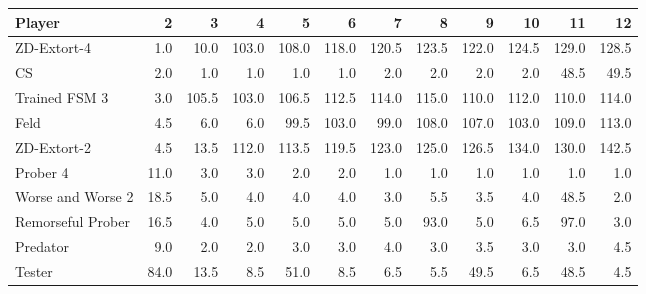 \begin{tabular}{lrrrrrrrrrrr}
\toprule
            Player &     2 &      3 &      4 &      5 &      6 &      7 &      8 &      9 &     10 &     11 &     12 \\
\midrule
       ZD-Extort-4 &   1.0 &   10.0 &  103.0 &  108.0 &  118.0 &  120.5 &  123.5 &  122.0 &  124.5 &  129.0 &  128.5 \\
                CS &   2.0 &    1.0 &    1.0 &    1.0 &    1.0 &    2.0 &    2.0 &    2.0 &    2.0 &   48.5 &   49.5 \\
     Trained FSM 3 &   3.0 &  105.5 &  103.0 &  106.5 &  112.5 &  114.0 &  115.0 &  110.0 &  112.0 &  110.0 &  114.0 \\
              Feld &   4.5 &    6.0 &    6.0 &   99.5 &  103.0 &   99.0 &  108.0 &  107.0 &  103.0 &  109.0 &  113.0 \\
       ZD-Extort-2 &   4.5 &   13.5 &  112.0 &  113.5 &  119.5 &  123.0 &  125.0 &  126.5 &  134.0 &  130.0 &  142.5 \\
          Prober 4 &  11.0 &    3.0 &    3.0 &    2.0 &    2.0 &    1.0 &    1.0 &    1.0 &    1.0 &    1.0 &    1.0 \\
 Worse and Worse 2 &  18.5 &    5.0 &    4.0 &    4.0 &    4.0 &    3.0 &    5.5 &    3.5 &    4.0 &   48.5 &    2.0 \\
 Remorseful Prober &  16.5 &    4.0 &    5.0 &    5.0 &    5.0 &    5.0 &   93.0 &    5.0 &    6.5 &   97.0 &    3.0 \\
          Predator &   9.0 &    2.0 &    2.0 &    3.0 &    3.0 &    4.0 &    3.0 &    3.5 &    3.0 &    3.0 &    4.5 \\
            Tester &  84.0 &   13.5 &    8.5 &   51.0 &    8.5 &    6.5 &    5.5 &   49.5 &    6.5 &   48.5 &    4.5 \\
\bottomrule
\end{tabular}
